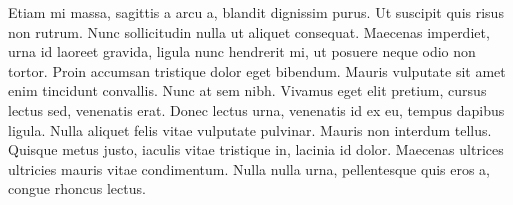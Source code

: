 Etiam mi massa, sagittis a arcu a, blandit dignissim purus. Ut suscipit quis risus non rutrum. Nunc sollicitudin nulla ut aliquet consequat. Maecenas imperdiet, urna id laoreet gravida, ligula nunc hendrerit mi, ut posuere neque odio non tortor. Proin accumsan tristique dolor eget bibendum. Mauris vulputate sit amet enim tincidunt convallis. Nunc at sem nibh. Vivamus eget elit pretium, cursus lectus sed, venenatis erat. Donec lectus urna, venenatis id ex eu, tempus dapibus ligula. Nulla aliquet felis vitae vulputate pulvinar. Mauris non interdum tellus. Quisque metus justo, iaculis vitae tristique in, lacinia id dolor. Maecenas ultrices ultricies mauris vitae condimentum. Nulla nulla urna, pellentesque quis eros a, congue rhoncus lectus.



